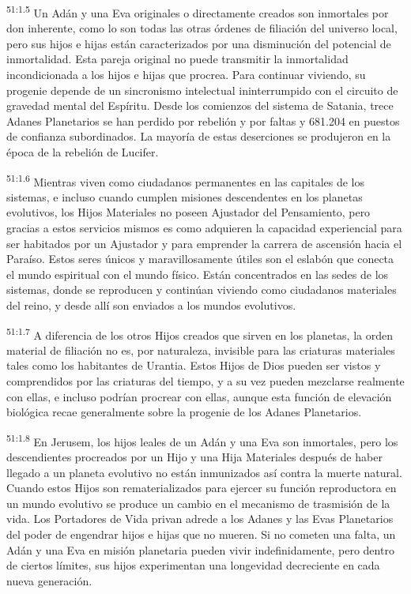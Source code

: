 \par
\textsuperscript{51:1.5} Un Adán y una Eva originales o directamente creados son inmortales por don inherente, como lo son todas las otras órdenes de filiación del universo local, pero sus hijos e hijas están caracterizados por una disminución del potencial de inmortalidad. Esta pareja original no puede transmitir la inmortalidad incondicionada a los hijos e hijas que procrea. Para continuar viviendo, su progenie depende de un sincronismo intelectual ininterrumpido con el circuito de gravedad mental del Espíritu. Desde los comienzos del sistema de Satania, trece Adanes Planetarios se han perdido por rebelión y por faltas y 681.204 en puestos de confianza subordinados. La mayoría de estas deserciones se produjeron en la época de la rebelión de Lucifer.

\par
\textsuperscript{51:1.6} Mientras viven como ciudadanos permanentes en las capitales de los sistemas, e incluso cuando cumplen misiones descendentes en los planetas evolutivos, los Hijos Materiales no poseen Ajustador del Pensamiento, pero gracias a estos servicios mismos es como adquieren la capacidad experiencial para ser habitados por un Ajustador y para emprender la carrera de ascensión hacia el Paraíso. Estos seres únicos y maravillosamente útiles son el eslabón que conecta el mundo espiritual con el mundo físico. Están concentrados en las sedes de los sistemas, donde se reproducen y continúan viviendo como ciudadanos materiales del reino, y desde allí son enviados a los mundos evolutivos.

\par
\textsuperscript{51:1.7} A diferencia de los otros Hijos creados que sirven en los planetas, la orden material de filiación no es, por naturaleza, invisible para las criaturas materiales tales como los habitantes de Urantia. Estos Hijos de Dios pueden ser vistos y comprendidos por las criaturas del tiempo, y a su vez pueden mezclarse realmente con ellas, e incluso podrían procrear con ellas, aunque esta función de elevación biológica recae generalmente sobre la progenie de los Adanes Planetarios.

\par
\textsuperscript{51:1.8} En Jerusem, los hijos leales de un Adán y una Eva son inmortales, pero los descendientes procreados por un Hijo y una Hija Materiales después de haber llegado a un planeta evolutivo no están inmunizados así contra la muerte natural. Cuando estos Hijos son rematerializados para ejercer su función reproductora en un mundo evolutivo se produce un cambio en el mecanismo de trasmisión de la vida. Los Portadores de Vida privan adrede a los Adanes y las Evas Planetarios del poder de engendrar hijos e hijas que no mueren. Si no cometen una falta, un Adán y una Eva en misión planetaria pueden vivir indefinidamente, pero dentro de ciertos límites, sus hijos experimentan una longevidad decreciente en cada nueva generación.

